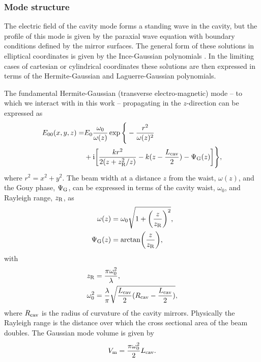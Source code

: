 \documentclass[../Thesis-IJspeert.tex]{subfiles}
\begin{document}
\subsubsection*{Mode structure}

The electric field of the cavity mode forms a standing wave in the cavity, but the profile of this mode is given by the paraxial wave equation with boundary conditions defined by the mirror surfaces.  The general form of these solutions in elliptical coordinates is given by the Ince-Gaussian polynomials \cite{bandres04}.  In the limiting cases of cartesian or cylindrical coordinates these solutions are then expressed in terms of the Hermite-Gaussian and Laguerre-Gaussian polynomials.

The fundamental Hermite-Gaussian  (transverse electro-magnetic) mode -- to which we interact with in this work -- propagating in the $z$-direction can be expressed as
\begin{equation}
\begin{split}
	E_{00}(x,y,z)=&E_0 \frac{\omega_0}{\omega(z)}\exp \Bigg\{ -\frac{r^2}{\omega(z)^2} \\&+ \ii \left[ \frac{k r^2}{2(z + z\sub{R}^2/z)} - k(z - \frac{L\sub{cav}}{2}) - \Psi\sub{G}(z) \right] \Bigg\},
\end{split}
	\label{eq:tem00}
\end{equation}
where $r^2=x^2+y^2$.  The beam width at a distance $z$ from the waist, $\omega(z)$, and the Gouy phase, $\Psi_{\mathrm{G}}$, can be expressed in terms of the cavity waist, $\omega_0$, and Rayleigh range, $z_{\mathrm{R}}$, as \cite{svelto10}
\begin{align}
	\omega(z) &= \omega_0\sqrt{ 1+ \left( \frac{z}{z\sub{R}} \right)^2},
	\label{eq:beamWaistZ}\\
	\Psi\sub{G}(z) &= \arctan \left( \frac{z}{z\sub{R}} \right),
	\label{eq:gouyPhase}
\end{align}
with
\begin{align}
	z_{\mathrm{R}} &= \frac{\pi \omega_{0}^2}{\lambda},
	\label{eq:rayleighRange}\\
	\omega_{0}^2 &= \frac{\lambda}{\pi} \sqrt{ \frac{L_{\mathrm{cav}}}{2} ( R_{\mathrm{cav}} - \frac{L_{\mathrm{cav}}}{2} ) },
	\label{eq:beamWaist0}
\end{align}
where  $R_{\mathrm{cav}}$ is the radius of curvature of the cavity mirrors. Physically the Rayleigh range is the distance over which the cross sectional area of the beam doubles.  The  Gaussian mode volume is given by\footnotemark{} \cite{barter16}
\begin{equation}
	V_{\mathrm{m}} = \frac{\pi \omega_{0}^2}{2}L_{\mathrm{cav}}.
	\label{eq:cavModeVolume}
\end{equation}
\end{document}
